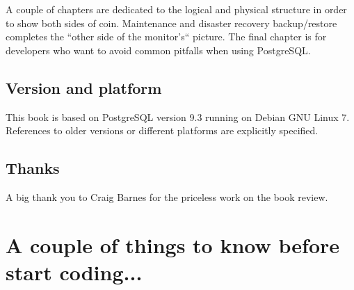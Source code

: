\documentclass[oneside]{book}
\begin{document}
A couple of chapters are dedicated to the logical and physical structure in
order to show both sides of coin.  Maintenance and disaster recovery
backup/restore completes the ``other side of the monitor's`` picture.
The final chapter is for developers who want to avoid common pitfalls when
using PostgreSQL.

\section*{Version and platform}
This book is based on PostgreSQL version 9.3 running on Debian GNU Linux 7.
References to older versions or different platforms are explicitly specified.

\section*{Thanks}
A big thank you to Craig Barnes for the priceless work on the book review.










\chapter{A couple of things to know before start coding...}
\label{cha:COUPLETHINGS}
%

\appendix

\listoffigures
\listoftables
\printindex{}
\end{document}
